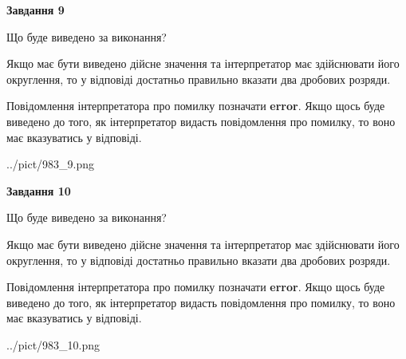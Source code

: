 \documentclass[12pt, ukrainian]{article}
\begin{document}
{\begin {Large}
{\begin {center}\textbf{Завдання 9}\end {center}}\par
Що буде виведено за виконання? \par

Якщо має бути виведено дійсне значення та інтерпретатор має здійснювати його округлення, 
то у відповіді достатньо правильно вказати два дробових розряди.

Повідомлення інтерпретатора про помилку позначати \textbf{error}.
Якщо щось буде виведено до того, як інтерпретатор видасть повідомлення про помилку, 
то воно має вказуватись у відповіді. \par

\begin{center}
	{../pict/983_9.png}
\end{center}
\newpage

{\begin {center}\textbf{Завдання 10}\end {center}}\par
Що буде виведено за виконання? \par

Якщо має бути виведено дійсне значення та інтерпретатор має здійснювати його округлення, 
то у відповіді достатньо правильно вказати два дробових розряди.

Повідомлення інтерпретатора про помилку позначати \textbf{error}.
Якщо щось буде виведено до того, як інтерпретатор видасть повідомлення про помилку, 
то воно має вказуватись у відповіді. \par

\begin{center}
	{../pict/983_10.png}
\end{center}
\newpage

\end {Large}}
\end{document}
